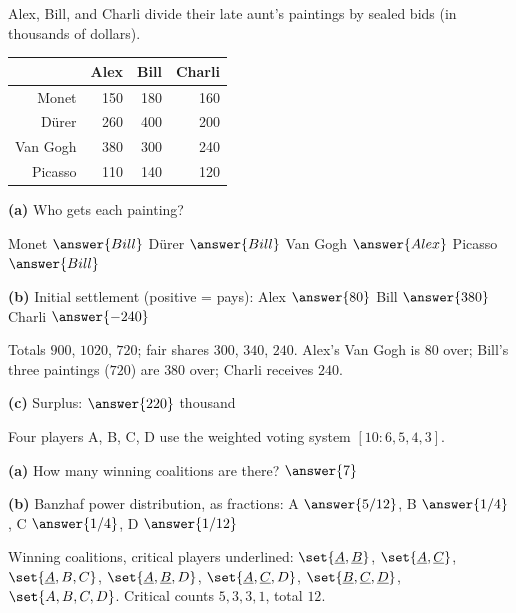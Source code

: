 \documentclass[12pt]{ximera}
\begin{document}
\begin{problem}
Alex, Bill, and Charli divide their late aunt's paintings by sealed bids (in thousands of
dollars).
\begin{center}
\begin{tabular}{r|rrr}
 & Alex & Bill & Charli\\\hline
Monet & 150 & 180 & 160\\
D\"urer & 260 & 400 & 200\\
Van Gogh & 380 & 300 & 240\\
Picasso & 110 & 140 & 120
\end{tabular}
\end{center}

\begin{prompt}
\textbf{(a)} Who gets each painting?

Monet $\answer{Bill}$ \quad D\"urer $\answer{Bill}$ \quad Van Gogh $\answer{Alex}$ \quad
Picasso $\answer{Bill}$
\end{prompt}

\begin{prompt}
\textbf{(b)} Initial settlement (positive = pays): Alex $\answer{80}$ \quad Bill
$\answer{380}$ \quad Charli $\answer{-240}$
\begin{feedback}
Totals $900$, $1020$, $720$; fair shares $300$, $340$, $240$. Alex's Van Gogh is $80$ over;
Bill's three paintings ($720$) are $380$ over; Charli receives $240$.
\end{feedback}
\end{prompt}

\begin{prompt}
\textbf{(c)} Surplus: $\answer{220}$ thousand
\end{prompt}
\end{problem}

\begin{problem}
Four players A, B, C, D use the weighted voting system $[10:6,5,4,3]$.

\begin{prompt}
\textbf{(a)} How many winning coalitions are there? $\answer{7}$
\end{prompt}

\begin{prompt}
\textbf{(b)} Banzhaf power distribution, as fractions: A $\answer{5/12}$, B $\answer{1/4}$,
C $\answer{1/4}$, D $\answer{1/12}$
\begin{feedback}
Winning coalitions, critical players underlined:
$\set{\underline A,\underline B}$, $\set{\underline A,\underline C}$,
$\set{\underline A,B,C}$, $\set{\underline A,\underline B,D}$,
$\set{\underline A,\underline C,D}$, $\set{\underline B,\underline C,\underline D}$,
$\set{A,B,C,D}$. Critical counts $5,3,3,1$, total $12$.
\end{feedback}
\end{prompt}
\end{problem}
\end{document}
